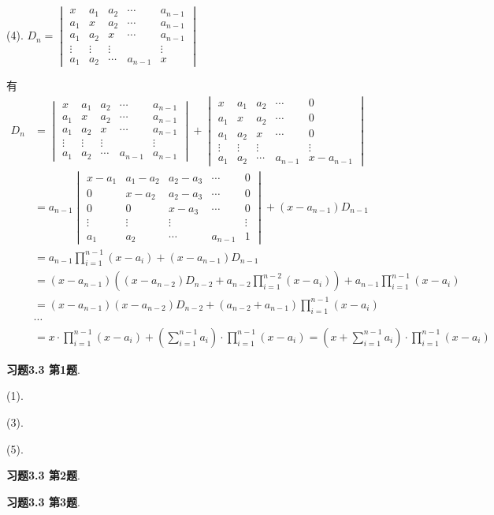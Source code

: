 (4). $D_n = \begin{vmatrix}
x & a_1 & a_2 & \cdots & a_{n-1} \\ a_1 & x & a_2 & \cdots & a_{n-1} \\ a_1 & a_2 & x & \cdots & a_{n-1} \\ \vdots & \vdots & \vdots & & \vdots \\ a_1 & a_2 & \cdots & a_{n-1} & x
\end{vmatrix}$

有
\begin{align*}
D_n & = \begin{vmatrix}
x & a_1 & a_2 & \cdots & a_{n-1} \\ a_1 & x & a_2 & \cdots & a_{n-1} \\ a_1 & a_2 & x & \cdots & a_{n-1} \\ \vdots & \vdots & \vdots & & \vdots \\ a_1 & a_2 & \cdots & a_{n-1} & a_{n-1}
\end{vmatrix} + \begin{vmatrix}
x & a_1 & a_2 & \cdots & 0 \\ a_1 & x & a_2 & \cdots & 0 \\ a_1 & a_2 & x & \cdots & 0 \\ \vdots & \vdots & \vdots & & \vdots \\ a_1 & a_2 & \cdots & a_{n-1} & x-a_{n-1} \end{vmatrix} \\
& = a_{n-1} \begin{vmatrix}
x-a_1 & a_1-a_2 & a_2-a_3 & \cdots & 0 \\ 0 & x-a_2 & a_2-a_3 & \cdots & 0 \\ 0 & 0 & x-a_3 & \cdots & 0 \\ \vdots & \vdots & \vdots & & \vdots \\ a_1 & a_2 & \cdots & a_{n-1} & 1
\end{vmatrix} + (x-a_{n-1}) D_{n-1} \\
& = a_{n-1} \prod_{i=1}^{n-1}(x-a_i) + (x-a_{n-1}) D_{n-1} \\
& = (x-a_{n-1}) \left( (x-a_{n-2})D_{n-2} + a_{n-2}\prod_{i=1}^{n-2}(x-a_i) \right) + a_{n-1} \prod_{i=1}^{n-1}(x-a_i) \\
& = (x-a_{n-1})(x-a_{n-2})D_{n-2} + (a_{n-2} + a_{n-1}) \prod_{i=1}^{n-1}(x-a_i) \\
& \cdots \\
& = x \cdot \prod_{i=1}^{n-1}(x-a_i) + \left( \sum_{i=1}^{n-1} a_i \right) \cdot \prod_{i=1}^{n-1}(x-a_i) = \left(x + \sum_{i=1}^{n-1} a_i \right) \cdot \prod_{i=1}^{n-1}(x-a_i)
\end{align*}

\newpageorvspace

{\bf 习题3.3 第1题}.

(1). 

(3). 

(5).

\newpageorvspace

{\bf 习题3.3 第2题}.

\newpageorvspace

{\bf 习题3.3 第3题}.



